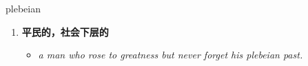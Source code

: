 
\begin{frame}
{\huge plebeian}
\begin{center}
\begin{enumerate}\Large
  \item \textbf{平民的，社会下层的}
  \begin{itemize}
    \item \em{\Large{a man who rose to greatness but never forget his plebeian past.}}
  \end{itemize}
\end{enumerate}
\end{center}
\end{frame}
